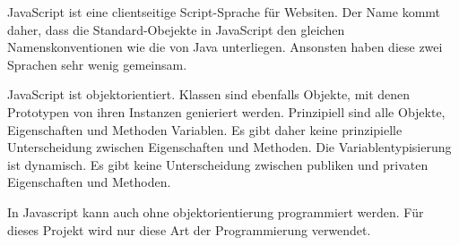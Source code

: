 JavaScript ist eine clientseitige Script-Sprache für Websiten. Der Name kommt daher, dass die Standard-Obejekte in JavaScript den gleichen Namenskonventionen wie die von Java unterliegen. Ansonsten haben diese zwei Sprachen sehr wenig gemeinsam.

JavaScript ist objektorientiert. Klassen sind ebenfalls Objekte, mit denen Prototypen von ihren Instanzen genieriert werden. Prinzipiell sind alle Objekte, Eigenschaften und Methoden Variablen. Es gibt daher keine prinzipielle Unterscheidung zwischen Eigenschaften und Methoden. Die Variablentypisierung ist dynamisch. Es gibt keine Unterscheidung zwischen publiken und privaten Eigenschaften und Methoden.

In Javascript kann auch ohne objektorientierung programmiert werden. Für dieses Projekt wird nur diese Art der Programmierung verwendet.